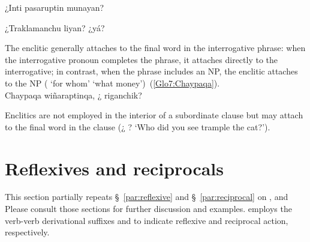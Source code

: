 %
{¿Inti pasaruptin  munayan?}%
{}%
{}{}%

%
{¿Traklamanchu liyan? ¿yá?}%
{}%
{}{}%

\noindent
The enclitic generally attaches to the final word in the interrogative phrase: when the interrogative pronoun completes the phrase, it attaches directly to the interrogative; in contrast, when the phrase includes an NP, the enclitic attaches to the NP ( ‘for whom’   ‘what money’)~(\ref{Glo7:Chaypaqa}).\\

%
{Chaypaqa wiñaraptinqa, ¿  riganchik?}%
{}%
{}{}%

Enclitics are not employed in the interior of a subordinate clause but may attach to the final word in the clause (¿   ? ‘Who did you see trample the cat?’).

\section{Reflexives and reciprocals}
This section partially repeats §~\ref{par:reflexive} and §~\ref{par:reciprocal} on , and  Please consult those sections for further discussion and examples. \SYQ{} employs the verb-verb derivational suffixes  and  to indicate reflexive and reciprocal action, respectively.\\

